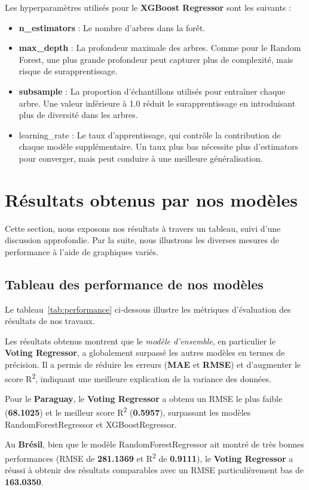 Les hyperparamètres utilisés pour le \textbf{XGBoost Regressor} sont les suivants :
\begin{itemize}
	\item \textbf{n\_estimators} : Le nombre d'arbres dans la forêt.
	\item \textbf{max\_depth} : La profondeur maximale des arbres. Comme pour le Random Forest, une plus grande profondeur peut capturer plus de complexité, mais risque de surapprentissage.
	\item \textbf{subsample} : La proportion d'échantillons utilisés pour entraîner chaque arbre. Une valeur inférieure à 1.0 réduit le surapprentissage en introduisant plus de diversité dans les arbres.
	\item \textsf{learning\_rate} : Le taux d'apprentissage, qui contrôle la contribution de chaque modèle supplémentaire. Un taux plus bas nécessite plus d'estimators pour converger, mais peut conduire à une meilleure généralisation.
\end{itemize}

\section{Résultats obtenus par nos modèles}
Cette section, nous exposons nos résultats à travers un tableau, suivi d’une discussion approfondie. Par la suite, nous illustrons les diverses mesures de performance à l’aide de graphiques variés.
\subsection{Tableau des performance de nos modèles}
Le tableau~\ref{tab:performance} ci-dessous illustre les métriques d’évaluation des résultats de nos travaux.

Les résultats obtenus montrent que le \textit{modèle d'ensemble}, en particulier le \textbf{Voting Regressor}, a globalement surpassé les autres modèles en termes de précision. Il a permis de réduire les erreurs (\textbf{MAE} et \textbf{RMSE}) et d'augmenter le score R\textsuperscript{2}, indiquant une meilleure explication de la variance des données.

Pour le \textbf{Paraguay}, le \textbf{Voting Regressor} a obtenu un RMSE le plus faible (\textbf{68.1025}) et le meilleur score R\textsuperscript{2} (\textbf{0.5957}), surpassant les modèles RandomForestRegressor et XGBoostRegressor.

Au \textbf{Brésil}, bien que le modèle RandomForestRegressor ait montré de très bonnes performances (RMSE de\textbf{ 281.1369} et R\textsuperscript{2} de \textbf{0.9111}), le \textbf{Voting Regressor} a réussi à obtenir des résultats comparables avec un RMSE particulièrement bas de \textbf{163.0350}.

